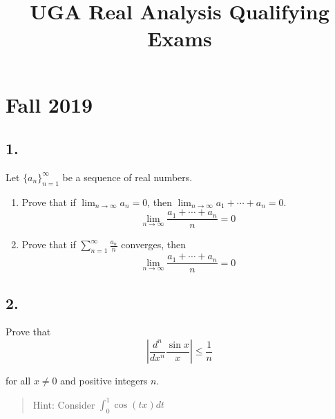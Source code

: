 


\usepackage{environ}
\let\proof\killcontents
\let\endproof\endkillcontents

\title{UGA Real Analysis Qualifying Exams}
\date{}


\maketitle
\tableofcontents 
\newpage

\hypertarget{fall-2019}{%
\section{Fall 2019}\label{fall-2019}}

\hypertarget{section}{%
\subsection{1.}\label{section}}

Let \(\{a_n\}_{n=1}^\infty\) be a sequence of real numbers.

\begin{enumerate}
\def\labelenumi{\alph{enumi}.}
\item
  Prove that if \(\displaystyle\lim_{n\to\infty} a_n = 0\), then
  \(\displaystyle\lim_{n\to\infty} a_1 + \cdots + a_n = 0\). \[
  \lim _{n \rightarrow \infty} \frac{a_{1}+\cdots+a_{n}}{n}=0
  \]
\item
  Prove that if \(\displaystyle\sum_{n=1}^{\infty} \frac{a_{n}}{n}\)
  converges, then \[
  \lim _{n \rightarrow \infty} \frac{a_{1}+\cdots+a_{n}}{n}=0
  \]
\end{enumerate}

\begin{proof}

\end{proof}

\hypertarget{section-1}{%
\subsection{2.}\label{section-1}}

Prove that \[
\left|\frac{d^{n}}{d x^{n}} \frac{\sin x}{x}\right| \leq \frac{1}{n}
\]

for all \(x \neq 0\) and positive integers \(n\).

\begin{quote}
Hint: Consider \(\displaystyle\int_0^1 \cos(tx) dt\)
\end{quote}

